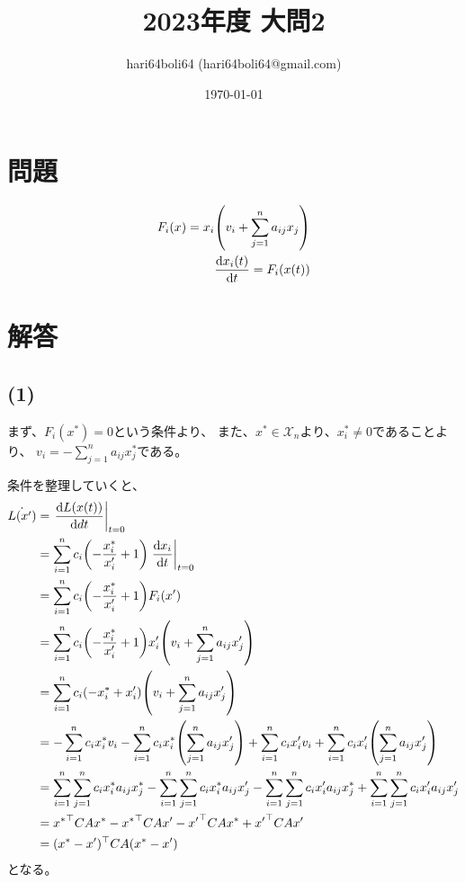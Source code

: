 \documentclass[a4paper, 10pt, dvipdfmx]{jlreq}
\begin{document}
\title{2023年度 大問2}
\author{hari64boli64 (hari64boli64@gmail.com)}
\date{\today}
\maketitle

\section{問題}

\begin{align*}
  F_i(x)=x_i \qty(v_i+\sum_{j=1}^{n}a_{ij}x_j) \\
  \dv{x_i(t)}{t}=F_i(x(t))
\end{align*}

\section{解答}

\subsection*{(1)}

まず、$F_i(x^*)=0$という条件より、
また、$x^* \in \mathcal{X}_n$より、$x^*_i \neq 0$であることより、
$v_i=-\sum_{j=1}^{n}{a_{ij}x^*_j}$である。

条件を整理していくと、
\begin{align*}
  \dot{L(x')} & =\left.\dv{L(x(t))}{dt}\right|_{t=0}                                                                  \\
              & =\sum_{i=1}^{n}{c_i\qty(-\frac{x_i^*}{x'_i}+1)\left.\dv{x_i}{t}\right|_{t=0}}                         \\
              & =\sum_{i=1}^{n}{c_i\qty(-\frac{x_i^*}{x'_i}+1)F_i(x')}                                                \\
              & =\sum_{i=1}^{n}{c_i\qty(-\frac{x_i^*}{x'_i}+1)x'_i\qty(v_i+\sum_{j=1}^{n}a_{ij}x'_j)}                 \\
              & =\sum_{i=1}^{n}{c_i\qty(-x_i^*+x'_i)\qty(v_i+\sum_{j=1}^{n}a_{ij}x'_j)}                               \\
              & =-\sum_{i=1}^{n}{c_i x_i^*v_i}-\sum_{i=1}^{n}{c_i x_i^*\qty(\sum_{j=1}^{n}a_{ij}x'_j)}
  +\sum_{i=1}^{n}{c_i x'_i v_i}+\sum_{i=1}^{n}{c_i x'_i\qty(\sum_{j=1}^{n}a_{ij}x'_j)}                                \\
              & =\sum_{i=1}^{n}\sum_{j=1}^{n}{c_i x_i^*a_{ij}x^*_j}-\sum_{i=1}^{n}\sum_{j=1}^{n}{c_i x_i^*a_{ij}x'_j}
  -\sum_{i=1}^{n}\sum_{j=1}^{n}{c_i x'_i a_{ij}x^*_j}+\sum_{i=1}^{n}\sum_{j=1}^{n}{c_i x'_i a_{ij}x'_j}               \\
              & ={x^*}^\top CAx^*-{x^*}^\top CAx'-{x'}^\top CAx^*+{x'}^\top CAx'                                      \\
              & =(x^*-x')^\top CA(x^*-x')
\end{align*}
となる。
\end{document}
